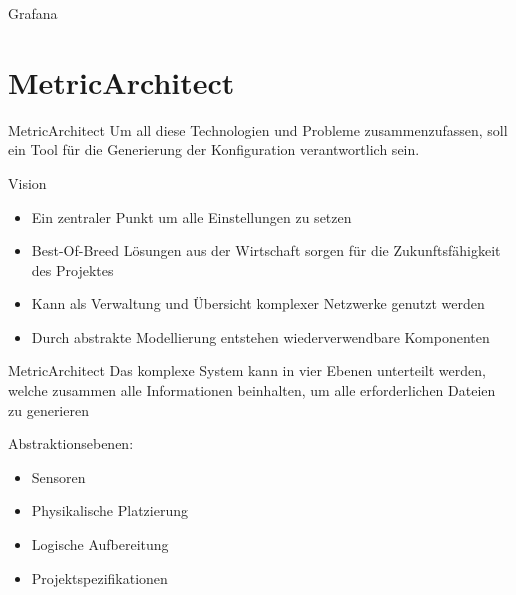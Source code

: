\documentclass[12pt, pdf, xcolor={table, dvipsnames}, paperheight=8cm,paperwidth=12cm]{beamer}
\begin{document}
\begin{frame}{Grafana}
\end{frame}

\section{MetricArchitect}
\begin{frame}{MetricArchitect}
	Um all diese Technologien und Probleme zusammenzufassen, soll ein Tool für die Generierung der Konfiguration verantwortlich sein.
	\begin{block}{Vision}
		\begin{itemize}
			\item Ein zentraler Punkt um alle Einstellungen zu setzen
			\item Best-Of-Breed Lösungen aus der Wirtschaft sorgen für die Zukunftsfähigkeit des Projektes
			\item Kann als Verwaltung und Übersicht komplexer Netzwerke genutzt werden
			\item Durch abstrakte Modellierung entstehen wiederverwendbare Komponenten
		\end{itemize}
	\end{block}
\end{frame}


\begin{frame}{MetricArchitect}
	Das komplexe System kann in vier Ebenen unterteilt werden, welche zusammen  alle Informationen beinhalten, um alle erforderlichen Dateien zu generieren
	
	\begin{block}{Abstraktionsebenen:}
		\begin{itemize}
			\item Sensoren
			\item Physikalische Platzierung
			\item Logische Aufbereitung
			\item Projektspezifikationen
		\end{itemize}
	\end{block}
\end{frame}
\end{document}
